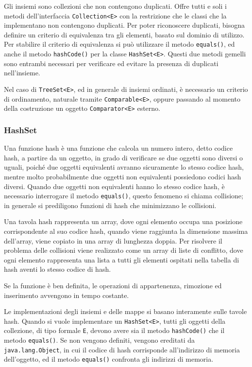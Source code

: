 \documentclass{article}
\numberwithin{equation}{subsection}
\begin{document}
Gli insiemi sono collezioni che non contengono duplicati. Offre tutti e soli i metodi dell'interfaccia \verb|Collection<E>| con la restrizione che le classi che la 
implementano non contengono duplicati. 
Per poter riconoscere duplicati, bisogna definire un criterio di equivalenza tra gli elementi, basato sul dominio di utilizzo. 
Per stabilire il criterio di equivalenza si può utilizzare il metodo \verb|equals()|, ed anche il metodo \verb|hashCode()| per la classe \verb|HashSet<E>|. 
Questi due metodi gemelli sono entrambi necessari per verificare ed evitare la presenza di duplicati nell'insieme. 

Nel caso di \verb|TreeSet<E>|, ed in generale di insiemi ordinati, è necessario un criterio di ordinamento, naturale tramite \verb|Comparable<E>|, oppure passando al 
momento della costruzione un oggetto \verb|Comparator<E>| esterno. 

\subsubsection{HashSet}

Una funzione hash è una funzione che calcola un numero intero, detto codice hash, a partire da un oggetto, in grado di verificare se due oggetti sono diversi o uguali, 
poiché due oggetti equivalenti avranno sicuramente lo stesso codice hash, mentre molto probabilmente due oggetti non equivalenti possiedono codici hash diversi. 
Quando due oggetti non equivalenti hanno lo stesso codice hash, è necessario interrogare il metodo \verb|equals()|, questo fenomeno si chiama collisione; in generale 
si prediligono funzioni di hash che minimizzano le collisioni. 

Una tavola hash rappresenta un array, dove ogni elemento occupa una posizione corrispondente al suo codice hash, quando viene raggiunta la dimensione massima dell'array, 
viene copiato in una array di lunghezza doppia. 
Per risolvere il problema delle collisioni viene realizzato come un array di liste di conflitto, dove ogni elemento rappresenta una lista a tutti gli elementi ospitati 
nella tabella di hash aventi lo stesso codice di hash. 

Se la funzione è ben definita, le operazioni di appartenenza, rimozione ed inserimento avvengono in tempo costante. 

Le implementazioni degli insiemi e delle mappe si basano interamente sulle tavole hash. 
Quando si vuole implementare un \verb|HashSet<E>|, tutti gli oggetti della collezione, di tipo formale \verb|E|, devono avere sia il metodo \verb|hashCode()| che il metodo 
\verb|equals()|. 
Se non vengono definiti, vengono ereditati da \verb|java.lang.Object|, in cui il codice di hash corrisponde all'indirizzo di memoria dell'oggetto, ed il metodo \verb|equals()| 
confronta gli indirizzi di memoria. 
\end{document}
